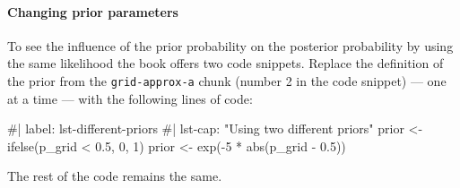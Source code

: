 \documentclass[
  letterpaper,
  DIV=11,
  numbers=noendperiod]{scrreprt}
\let\oldparagraph\paragraph
\renewcommand{\paragraph}[1]{\oldparagraph{#1}\mbox{}}
\newenvironment{Shaded}{\begin{snugshade}}{\end{snugshade}}
\newcommand{\CommentTok}[1]{\textcolor[rgb]{0.37,0.37,0.37}{#1}}
\newcommand{\DecValTok}[1]{\textcolor[rgb]{0.68,0.00,0.00}{#1}}
\newcommand{\FloatTok}[1]{\textcolor[rgb]{0.68,0.00,0.00}{#1}}
\newcommand{\FunctionTok}[1]{\textcolor[rgb]{0.28,0.35,0.67}{#1}}
\newcommand{\NormalTok}[1]{\textcolor[rgb]{0.00,0.23,0.31}{#1}}
\newcommand{\OtherTok}[1]{\textcolor[rgb]{0.00,0.23,0.31}{#1}}
\newcommand{\SpecialCharTok}[1]{\textcolor[rgb]{0.37,0.37,0.37}{#1}}
\begin{document}
\hypertarget{changing-prior-parameters}{%
\paragraph{Changing prior parameters}\label{changing-prior-parameters}}

To see the influence of the prior probability on the posterior
probability by using the same likelihood the book offers two code
snippets. Replace the definition of the prior from the
\texttt{grid-approx-a} chunk (number 2 in the code snippet) --- one at a
time --- with the following lines of code:

\begin{Shaded}
\begin{Highlighting}[]
\CommentTok{\#| label: lst{-}different{-}priors}
\CommentTok{\#| lst{-}cap: "Using two different priors"}
\NormalTok{prior }\OtherTok{\textless{}{-}} \FunctionTok{ifelse}\NormalTok{(p\_grid }\SpecialCharTok{\textless{}} \FloatTok{0.5}\NormalTok{, }\DecValTok{0}\NormalTok{, }\DecValTok{1}\NormalTok{)}
\NormalTok{prior }\OtherTok{\textless{}{-}} \FunctionTok{exp}\NormalTok{(}\SpecialCharTok{{-}}\DecValTok{5} \SpecialCharTok{*} \FunctionTok{abs}\NormalTok{(p\_grid }\SpecialCharTok{{-}} \FloatTok{0.5}\NormalTok{))}
\end{Highlighting}
\end{Shaded}

The rest of the code remains the same.
\end{document}
